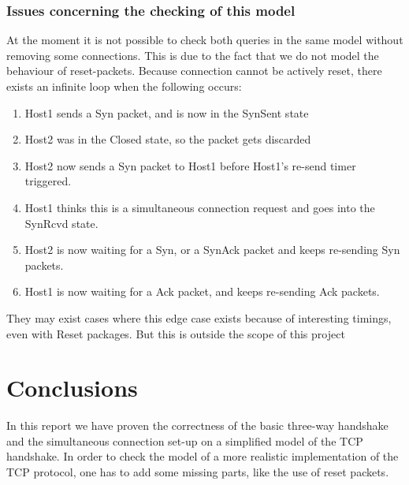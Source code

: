 \documentclass[twocolumn]{article}
\begin{document}
		\subsubsection{Issues concerning the checking of this model}
		At the moment it is not possible to check both queries in the same model without removing some connections. This is due to the fact that we do not model the behaviour of reset-packets. Because connection cannot be actively reset, there exists an infinite loop when the following occurs:
		\begin{enumerate}
			\item Host1 sends a Syn packet, and is now in the SynSent state
			\item Host2 was in the Closed state, so the packet gets discarded
			\item Host2 now sends a Syn packet to Host1 before Host1's re-send timer triggered.
			\item Host1 thinks this is a simultaneous connection request and goes into the SynRcvd state. 
			\item Host2 is now waiting for a Syn, or a SynAck packet and keeps re-sending Syn packets.
			\item Host1 is now waiting for a Ack packet, and keeps re-sending Ack packets.
		\end{enumerate}
		They may exist cases where this edge case exists because of interesting timings, even with Reset packages. But this is outside the scope of this project
	

\section{Conclusions}
		In this report we have proven the correctness of the basic three-way handshake and the simultaneous connection set-up on a simplified model of the TCP handshake. In order to check the model of a more realistic implementation of the TCP protocol, one has to add some missing parts, like the use of reset packets.
\end{document}
